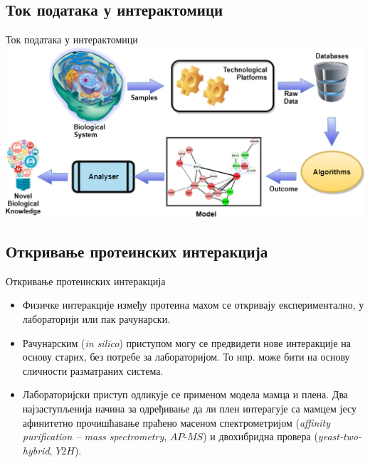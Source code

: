 \documentclass[hyperref={bookmarks=false}]{beamer}
\begin{document}
\subsection{Ток података у интерактомици}
\begin{frame}{Ток података у интерактомици}
\centering\includegraphics[width=.95\textwidth]{tok.png}
\end{frame}

\subsection{Откривање протеинских интеракција}
\begin{frame}{Откривање протеинских интеракција}
\begin{itemize}
	\item Физичке интеракције између протеина махом се откривају експериментално, у лабораторији или пак рачунарски.

	\item Рачунарским (\textit{in silico}) приступом могу се предвидети нове интеракције на основу старих, без потребе за лабораторијом. То нпр. може бити на основу сличности разматраних система.

	\item Лабораторијски приступ одликује се применом модела мамца и плена. Два најзаступљенија начина за одређивање да ли плен интерагује са мамцем јесу афинитетно прочишћавање праћено масеном спектрометријом (\textit{affinity purification -- mass spectrometry}, $AP$-$MS$) и двохибридна провера (\textit{yeast-two-hybrid}, $Y2H$).
\end{itemize}
\end{frame}
\end{document}

